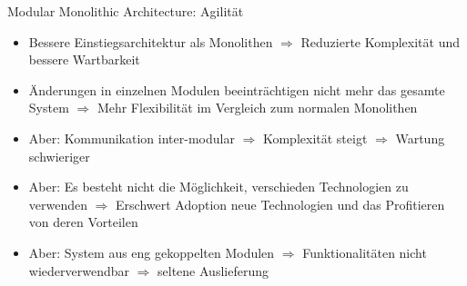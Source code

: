 \begin{frame}{Modular Monolithic Architecture: Agilität}
    \begin{itemize}
        \item Bessere Einstiegsarchitektur als Monolithen $\Rightarrow$ Reduzierte Komplexität und bessere Wartbarkeit
        \item Änderungen in einzelnen Modulen beeinträchtigen nicht mehr das gesamte System $\Rightarrow$ Mehr Flexibilität im Vergleich zum normalen Monolithen
        \item Aber: Kommunikation inter-modular $\Rightarrow$ Komplexität steigt $\Rightarrow$ Wartung schwieriger
        \item Aber: Es besteht nicht die Möglichkeit, verschieden Technologien zu verwenden $\Rightarrow$ Erschwert Adoption neue Technologien und das Profitieren von deren Vorteilen
        \item Aber: System aus eng gekoppelten Modulen $\Rightarrow$ Funktionalitäten nicht wiederverwendbar $\Rightarrow$ seltene Auslieferung
    \end{itemize}
\end{frame}